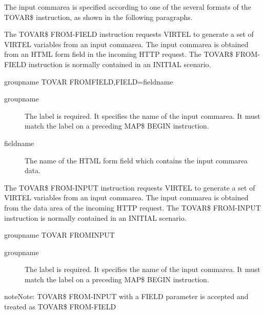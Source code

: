 \documentclass[letterpaper,10pt,english]{sphinxmanual}
\begin{document}
The input commarea is specified according to one of the several formats of the TOVAR\$ instruction, as shown in the
following paragraphs.


The TOVAR\$ FROM-FIELD instruction requests VIRTEL to generate a set of VIRTEL variables from an input commarea.
The input commarea is obtained from an HTML form field in the incoming HTTP request. The TOVAR\$ FROM-FIELD
instruction is normally contained in an INITIAL scenario.

\begin{sphinxVerbatim}[commandchars=\\\{\}]
groupname TOVAR\PYGZdl{} FROM\PYGZhy{}FIELD,FIELD=\PYGZsq{}fieldname\PYGZsq{}
\end{sphinxVerbatim}
\begin{description}
\item[{groupname}] \leavevmode
The label is required. It specifies the name of the input commarea. It must match the label on a preceding MAP\$ BEGIN instruction.

\item[{fieldname}] \leavevmode
The name of the HTML form field which contains the input commarea data.

\end{description}
\label{\detokenize{User_Guide:v457ug-tovar-from-input}}

The TOVAR\$ FROM-INPUT instruction requests VIRTEL to generate a set of VIRTEL variables from an input commarea.
The input commarea is obtained from the data area of the incoming HTTP request. The TOVAR\$ FROM-INPUT
instruction is normally contained in an INITIAL scenario.

\begin{sphinxVerbatim}[commandchars=\\\{\}]
groupname TOVAR\PYGZdl{} FROM\PYGZhy{}INPUT
\end{sphinxVerbatim}
\begin{description}
\item[{groupname}] \leavevmode
The label is required. It specifies the name of the input commarea. It must match the label on a preceding MAP\$ BEGIN instruction.

\end{description}

\begin{sphinxadmonition}{note}{Note:}
TOVAR\$ FROM-INPUT with a FIELD parameter is accepted and treated as TOVAR\$ FROM-FIELD
\end{sphinxadmonition}
\end{document}
